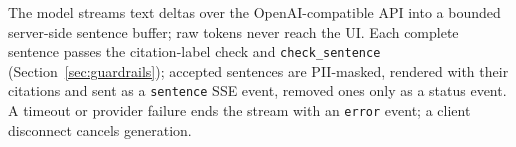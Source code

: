 The model streams text deltas over the OpenAI-compatible API into a bounded server-side sentence buffer; raw tokens never reach the UI.
Each complete sentence passes the citation-label check and \texttt{check\_sentence} (Section~\ref{sec:guardrails}); accepted sentences are PII-masked, rendered with their citations and sent as a \texttt{sentence} SSE event, removed ones only as a status event.
A timeout or provider failure ends the stream with an \texttt{error} event; a client disconnect cancels generation.

\FloatBarrier
